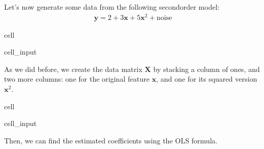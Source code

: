 \documentclass[letterpaper,10pt,english]{jupyterBook}
\begin{document}
\sphinxAtStartPar
Let’s now generate some data from the following second\sphinxhyphen{}order model:
\begin{equation*}
\begin{split}\mathbf{y} = 2 + 3\mathbf{x} + 5 \mathbf{x}^2 + \text{noise}\end{split}
\end{equation*}
\begin{sphinxuseclass}{cell}\begin{sphinxVerbatimInput}

\begin{sphinxuseclass}{cell_input}
\begin{sphinxVerbatim}[commandchars=\\\{\}]
       
               
\end{sphinxVerbatim}

\end{sphinxuseclass}\end{sphinxVerbatimInput}

\end{sphinxuseclass}
\sphinxAtStartPar
As we did before, we create the data matrix \(\mathbf{X}\) by stacking a column of ones, and two more columns: one for the original feature \(\mathbf{x}\), and one for its squared version \(\mathbf{x}^2\).

\begin{sphinxuseclass}{cell}\begin{sphinxVerbatimInput}

\begin{sphinxuseclass}{cell_input}
\begin{sphinxVerbatim}[commandchars=\\\{\}]
  \PYG{p}{[}   \PYG{p}{]}
\end{sphinxVerbatim}

\end{sphinxuseclass}\end{sphinxVerbatimInput}

\end{sphinxuseclass}
\sphinxAtStartPar
Then, we can find the estimated coefficients using the OLS formula.
\end{document}

